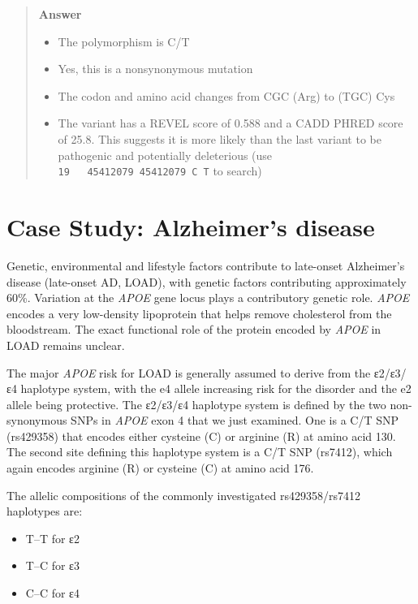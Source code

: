 \documentclass[
  letterpaper,
  DIV=11,
  numbers=noendperiod]{scrreprt}
\providecommand{\tightlist}{%
  \setlength{\itemsep}{0pt}\setlength{\parskip}{0pt}}
\begin{document}
\begin{tcolorbox}
\begin{quote}
\textbf{Answer}

\begin{itemize}
\tightlist
\item
  The polymorphism is C/T
\item
  Yes, this is a nonsynonymous mutation
\item
  The codon and amino acid changes from CGC (Arg) to (TGC) Cys
\item
  The variant has a REVEL score of 0.588 and a CADD PHRED score of 25.8.
  This suggests it is more likely than the last variant to be pathogenic
  and potentially deleterious (use
  \texttt{19\ \ \ 45412079\ 45412079\ C\ T} to search)
\end{itemize}
\end{quote}


\chapter{Case Study: Alzheimer's
disease}\label{case-study-alzheimers-disease}

Genetic, environmental and lifestyle factors contribute to late-onset
Alzheimer's disease (late-onset AD, LOAD), with genetic factors
contributing approximately 60\%. Variation at the \emph{APOE} gene locus
plays a contributory genetic role. \emph{APOE} encodes a very
low-density lipoprotein that helps remove cholesterol from the
bloodstream. The exact functional role of the protein encoded by
\emph{APOE} in LOAD remains unclear.

The major \emph{APOE} risk for LOAD is generally assumed to derive from
the ε2/ε3/ε4 haplotype system, with the e4 allele increasing risk for
the disorder and the e2 allele being protective. The ε2/ε3/ε4 haplotype
system is defined by the two non-synonymous SNPs in \emph{APOE} exon 4
that we just examined. One is a C/T SNP (rs429358) that encodes either
cysteine (C) or arginine (R) at amino acid 130. The second site defining
this haplotype system is a C/T SNP (rs7412), which again encodes
arginine (R) or cysteine (C) at amino acid 176.

The allelic compositions of the commonly investigated rs429358/rs7412
haplotypes are:

\begin{itemize}
\item
  T--T for ε2
\item
  T--C for ε3
\item
  C--C for ε4
\end{itemize}


\end{tcolorbox}
\end{document}
